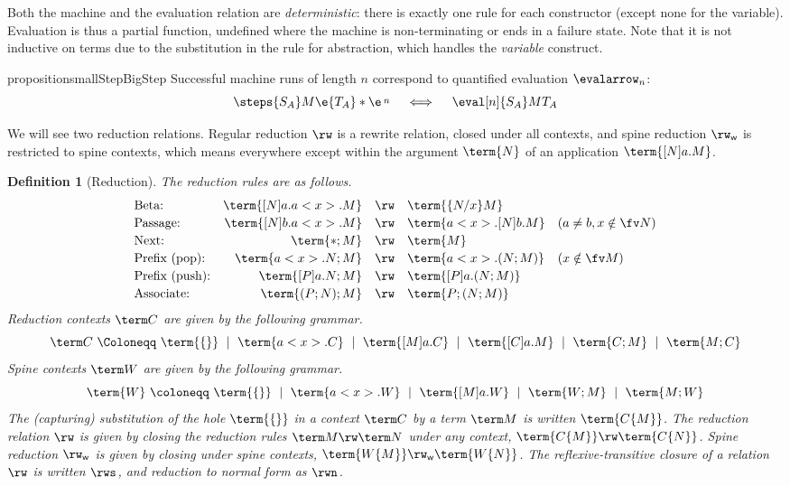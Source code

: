 \documentclass[10pt,a4paper]{amsart}
\newtheorem{definition}[theorem]{Definition}
\newcommand\spine{\mathsf w}
\begin{document}
Both the machine and the evaluation relation are \emph{deterministic}: there is exactly one rule for each constructor (except none for the variable). Evaluation is thus a partial function, undefined where the machine is non-terminating or ends in a failure state. Note that it is not inductive on terms due to the substitution in the rule for abstraction, which handles the \emph{variable} construct.

\begin{restatable}{proposition}{smallStepBigStep}
\label{prop:semantics agree}
Successful machine runs of length $n$ correspond to quantified evaluation $\evalarrow_n$:
\[
\steps 
  {S_A} M \e 
  {T_A} * \e
\,\raisebox{2pt}{$\scriptstyle n$}
\quad\iff\quad 
	\eval[n]{S_A}M{T_A}
\]
\end{restatable}

We will see two reduction relations. Regular reduction $\rw$ is a rewrite relation, closed under all contexts, and spine reduction $\rw_\spine$ is restricted to spine contexts, which means everywhere except within the argument $\term{N}$ of an application $\term{[N]a.M}$. 

\begin{definition}[Reduction]
The \emph{reduction rules} are as follows.
\[
\begin{array}{lrcll}
		\text{Beta:}          & \term{[N]a.a<x>.M} & \rw & \term{\{N/x\}M}
\\[2pt]	\text{Passage:}       & \term{[N]b.a<x>.M} & \rw & \term{a<x>.[N]b.M} & (a\neq b, x\notin\fv N)
\\[2pt] \text{Next:}          & \term{*;M}		   & \rw & \term{M}
\\[2pt] \text{Prefix (pop):}  & \term{a<x>.N ; M}  & \rw & \term{a<x>.(N;M)}  & (x\notin\fv M)
\\[2pt] \text{Prefix (push):} & \term{[P]a.N ; M}  & \rw & \term{[P]a.(N;M)}
\\[2pt] \text{Associate:}     & \term{(P;N) ; M}   & \rw & \term{P ; (N ; M)}
\end{array}
\]
\emph{Reduction contexts} $\term C$ are given by the following grammar.
\[
	\term C~\Coloneqq~
		\term{\{\}}
~\mid~	\term{a<x>.C}
~\mid~	\term{[M]a.C}
~\mid~	\term{[C]a.M}
~\mid~	\term{C;M}
~\mid~	\term{M;C}
\]
\emph{Spine contexts} $\term W$ are given by the following grammar.
\[
	\term{W}
~\coloneqq~ \term{\{\}}
~\mid~      \term{a<x>.W}
~\mid~      \term{[M]a.W}
~\mid~      \term{W;M}
~\mid~      \term{M;W}
\]
The (capturing) substitution of the hole $\term{\{\}}$ in a context $\term C$ by a term $\term M$ is written $\term{C\{M\}}$. The \emph{reduction} relation $\rw$ is given by closing the reduction rules $\term M\rw\term N$ under any context, $\term{C\{M\}}\rw\term{C\{N\}}$. \emph{Spine} reduction $\rw_\spine$ is given by closing under spine contexts, $\term{W\{M\}}\rw_\spine\term{W\{N\}}$. The reflexive-transitive closure of a relation $\rw$ is written $\rws$, and reduction to normal form as $\rwn$.
\end{definition}
\end{document}
